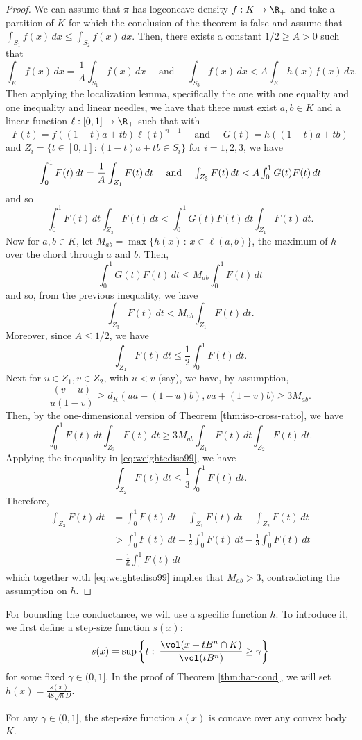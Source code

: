 \begin{proof}
We can assume that $\pi$ has logconcave density $f:K\rightarrow\R_{+}$
and take a partition of $K$ for which the conclusion of the theorem
is false and assume that $\int_{S_{1}}f(x)\,dx\le\int_{S_{2}}f(x)\,dx$.
Then, there exists a constant $1/2\ge A>0$ such that 
\[
\int_{K}f(x)\,dx=\frac{1}{A}\int_{S_{1}}f(x)\,dx\quad\mbox{ and }\quad\int_{S_{3}}f(x)\,dx<A\int_{K}h(x)f(x)\,dx.
\]
Then applying the localization lemma, specifically the one with one
equality and one inequality and linear needles, we have that there
must exist $a,b\in K$ and a linear function $\ell:[0,1]\rightarrow\R_{+}$
such that with 
\[
F(t)=f((1-t)a+tb)\ell(t)^{n-1}\quad\mbox{ and }\quad G(t)=h((1-t)a+tb)
\]
and $Z_{i}=\{t\in[0,1]:(1-t)a+tb\in S_{i}\}$ for $i=1,2,3$, we have
\[
\int_{0}^{1}F(t)\,dt=\frac{1}{A}\int_{Z_{1}}F(t)\,dt\quad\mbox{ and \ensuremath{\quad}\ensuremath{\int_{Z_{3}}F(t)\,dt<A\int_{0}^{1}G(t)F(t)\,dt}}
\]
and so 
\[
\int_{0}^{1}F(t)\,dt\int_{Z_{3}}F(t)\,dt<\int_{0}^{1}G(t)F(t)\,dt\int_{Z_{1}}F(t)\,dt.
\]
Now for $a,b\in K$, let $M_{ab}=\max\{h(x)\,:\,x\in\ell(a,b)\}$,
the maximum of $h$ over the chord through $a$ and $b$. Then, 
\[
\int_{0}^{1}G(t)F(t)\,dt\le M_{ab}\int_{0}^{1}F(t)\,dt
\]
and so, from the previous inequality, we have 
\begin{equation}
\int_{Z_{3}}F(t)\,dt<M_{ab}\int_{Z_{1}}F(t)\,dt.\label{eq:weightediso99}
\end{equation}
Moreover, since $A\le1/2$, we have 
\[
\int_{Z_{1}}F(t)\,dt\le\frac{1}{2}\int_{0}^{1}F(t)\,dt.
\]
Next for $u\in Z_{1},v\in Z_{2}$, with $u<v$ (say), we have, by
assumption, 
\[
\frac{(v-u)}{u(1-v)}\ge d_{K}(ua+(1-u)b),va+(1-v)b)\ge3M_{ab}.
\]
Then, by the one-dimensional version of Theorem \ref{thm:iso-cross-ratio},
we have 
\[
\int_{0}^{1}F(t)\,dt\int_{Z_{3}}F(t)\,dt\ge3M_{ab}\int_{Z_{1}}F(t)\,dt\int_{Z_{2}}F(t)\,dt.
\]
Applying the inequality in \ref{eq:weightediso99}, we have 
\[
\int_{Z_{2}}F(t)\,dt\le\frac{1}{3}\int_{0}^{1}F(t)\,dt.
\]
Therefore, 
\begin{align*}
\int_{Z_{3}}F(t)\,dt & =\int_{0}^{1}F(t)\,dt-\int_{Z_{1}}F(t)\,dt-\int_{Z_{2}}F(t)\,dt\\
 & >\int_{0}^{1}F(t)\,dt-\frac{1}{2}\int_{0}^{1}F(t)\,dt-\frac{1}{3}\int_{0}^{1}F(t)\,dt\\
 & =\frac{1}{6}\int_{0}^{1}F(t)\,dt
\end{align*}
which together with \ref{eq:weightediso99} implies that $M_{ab}>3$,
contradicting the assumption on $h$. 
\end{proof}
For bounding the conductance, we will use a specific function $h$.
To introduce it, we first define a step-size function $s(x)$:
\[
s(x)=\sup\left\{ t:\:\frac{\vol(x+tB^{n}\cap K)}{\vol(tB^{n})}\ge\gamma\right\} 
\]
for some fixed $\gamma\in(0,1]$. In the proof of Theorem \ref{thm:har-cond},
we will set $h(x)=\frac{s(x)}{48\sqrt{n}D}$. 
\begin{lem}
For any $\gamma\in(0,1]$, the step-size function $s(x)$ is concave
over any convex body $K$.
\end{lem}

